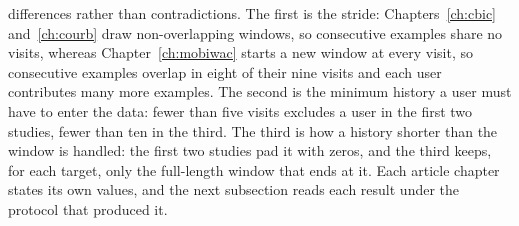 differences rather than contradictions. The first is the stride: Chapters~\ref{ch:cbic}
and~\ref{ch:courb} draw non-overlapping windows, so consecutive examples share no
visits, whereas Chapter~\ref{ch:mobiwac} starts a new window at every visit, so
consecutive examples overlap in eight of their nine visits and each user contributes
many more examples. The second is the minimum history a user must have to enter the
data: fewer than five visits excludes a user in the first two studies, fewer than ten
in the third. The third is how a history shorter than the window is handled: the first two studies pad it with zeros, and the third keeps, for
each target, only the full-length window that ends at it. Each article
chapter states its own values, and
the next subsection reads each result under the protocol that produced it.

